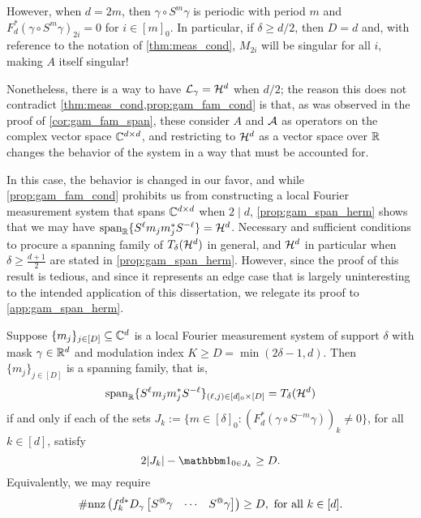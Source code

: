However, when $d = 2 m$, then $\gamma \circ S^m \gamma$ is periodic with period $m$ and $F_d^*(\gamma \circ S^m \gamma)_{2i} = 0$ for $i \in [m]_0$.  In particular, if $\delta \ge d / 2$, then $D = d$ and, with reference to the notation of \cref{thm:meas_cond}, $M_{2i}$ will be singular for all $i$, making $A$ itself singular!  

Nonetheless, there is a way to have $\mathcal{L}_\gamma = \mathcal{H}^d$ when $d / 2$; the reason this does not contradict \cref{thm:meas_cond,prop:gam_fam_cond} is that, as was observed in the proof of \cref{cor:gam_fam_span}, these consider $A$ and $\mathcal{A}$ as operators on the complex vector space $\mathbb{C}^{d \times d}$, and restricting to $\mathcal{H}^d$ as a vector space over $\mathbb{R}$ changes the behavior of the system in a way that must be accounted for.  

In this case, the behavior is changed in our favor, and while \cref{prop:gam_fam_cond} prohibits us from constructing a local Fourier measurement system that spans $\mathbb{C}^{d \times d}$ when $2 \mid d$, \cref{prop:gam_span_herm} shows that we may have $\operatorname{span}_{\mathbb{R}} \{S^{\ell} m_j m_j^* S^{-\ell}\} = \mathcal{H}^d$.  Necessary and sufficient conditions to procure a spanning family of $T_\delta(\mathcal{H}^d)$ in general, and $\mathcal{H}^d$ in particular when $\delta \ge \frac{d + 1}{2}$ are stated in \cref{prop:gam_span_herm}.  However, since the proof of this result is tedious, and since it represents an edge case that is largely uninteresting to the intended application of this dissertation, we relegate its proof to \cref{app:gam_span_herm}.

\begin{proposition}
  Suppose $\{m_j\}_{j \in [D]} \subseteq \mathbb{C}^d$ is a local Fourier measurement system of support $\delta$ with mask $\gamma \in \mathbb{R}^d$ and modulation index $K \ge D = \min (2 \delta - 1, d)$.  Then $\{m_j\}_{j \in [D]}$ is a spanning family, that is, \[\operatorname{span}_{\mathbb{R}}\{S^{\ell} m_j m_j^* S^{-\ell}\}_{(\ell, j) \in [d]_0 \times [D]} = T_\delta(\mathcal{H}^d)\] if and only if each of the sets $J_k := \{m \in [\delta]_0 : (F_d^* (\gamma \circ S^{-m} \gamma))_k \neq 0\}$, for all $k \in [d]$, satisfy \begin{equation} %
    2 \abs{J_k} - \one_{0 \in J_k} \ge D
    .\label{eq:J_k}\end{equation}  Equivalently, we may require \begin{equation} \#\mathrm{nnz}\left(f_k^{d*} D_\gamma \rowmatfun{S^@ \gamma}{1 - \delta}{\delta - 1}\right) \ge D, \ \text{for all} \ k \in [d].\label{eq:J_k_restate}\end{equation}
  \label{prop:span_fam} \label{prop:gam_span_herm}
\end{proposition}

